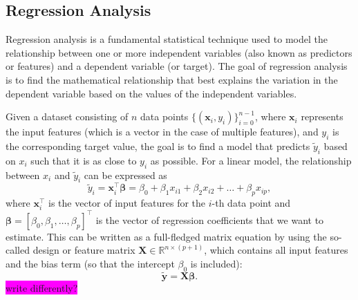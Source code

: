 \documentclass[aps,pra,english,notitlepage,reprint,nofootinbib]{revtex4-1}  %
\begin{document}

\subsection{Regression Analysis}
Regression analysis is a fundamental statistical technique used to model the relationship between one or more independent variables (also known as predictors or features) and a dependent variable (or target). The goal of regression analysis is to find the mathematical relationship that best explains the variation in the dependent variable based on the values of the independent variables.

Given a dataset consisting of $n$ data points $\{(\mathbf{x}_i, y_i)\}_{i=0}^{n-1}$, where $\mathbf{x}_i$ represents the input features (which is a vector in the case of multiple features), and $y_i$ is the corresponding target value, the goal is to find a model that predicts $\tilde{y}_i$ based on $x_i$ such that it is as close to $y_i$ as possible. For a linear model, the relationship between $x_i$ and $\tilde{y}_i$ can be expressed as
\begin{equation}
\tilde{y}_i = \mathbf{x}_i^\top \boldsymbol{\beta} = \beta_0 + \beta_1 x_{i1} + \beta_2 x_{i2} + \dots + \beta_p x_{ip},
\end{equation}
where $\mathbf{x}_i^\top$ is the vector of input features for the $i$-th data point and $\boldsymbol{\beta} = [\beta_0, \beta_1, \dots, \beta_p]^\top$ is the vector of regression coefficients that we want to estimate. This can be written as a full-fledged matrix equation by using the so-called design or feature matrix $\mathbf{X} \in \mathbb{R}^{n \times (p+1)}$, which contains all input features and the bias term (so that the intercept $\beta_0$ is included):
\begin{equation}
  \mathbf{\tilde{y}}=\mathbf{X}\boldsymbol{\beta}.
\end{equation}
\colorbox{magenta}{write differently?}
\end{document}
